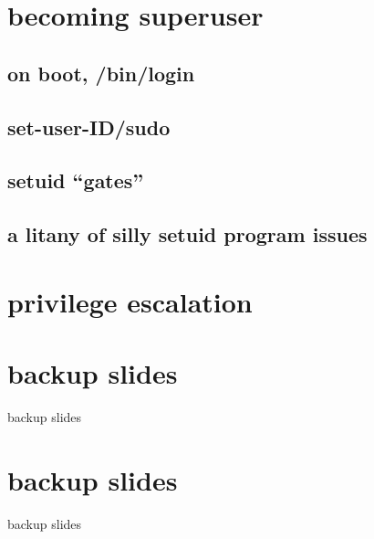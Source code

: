 \section{becoming superuser}

\subsection{on boot, /bin/login}


\subsection{set-user-ID/sudo}




\subsection{setuid ``gates''}


\subsection{a litany of silly setuid program issues}


\section{privilege escalation}




\section{backup slides}
\begin{frame}{backup slides}
\end{frame}





\section{backup slides}
\begin{frame}{backup slides}
\end{frame}


